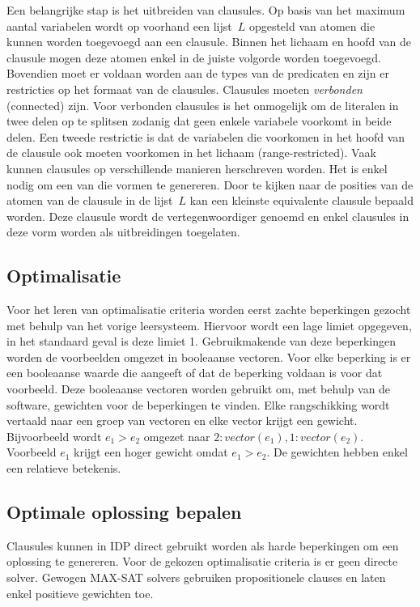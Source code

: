 Een belangrijke stap is het uitbreiden van clausules.
Op basis van het maximum aantal variabelen wordt op voorhand een lijst~$L$ opgesteld van atomen die kunnen worden toegevoegd aan een clausule.
Binnen het lichaam en hoofd van de clausule mogen deze atomen enkel in de juiste volgorde worden toegevoegd.
Bovendien moet er voldaan worden aan de types van de predicaten en zijn er restricties op het formaat van de clausules.
Clausules moeten \emph{verbonden} (connected) zijn.
Voor verbonden clausules is het onmogelijk om de literalen in twee delen op te splitsen zodanig dat geen enkele variabele voorkomt in beide delen.
Een tweede restrictie is dat de variabelen die voorkomen in het hoofd van de clausule ook moeten voorkomen in het lichaam (range-restricted).
Vaak kunnen clausules op verschillende manieren herschreven worden.
Het is enkel nodig om een van die vormen te genereren.
Door te kijken naar de posities van de atomen van de clausule in de lijst~$L$ kan een kleinste equivalente clausule bepaald worden.
Deze clausule wordt de vertegenwoordiger genoemd en enkel clausules in deze vorm worden als uitbreidingen toegelaten.

\subsection{Optimalisatie}
Voor het leren van optimalisatie criteria worden eerst zachte beperkingen gezocht met behulp van het vorige leersysteem.
Hiervoor wordt een lage limiet opgegeven, in het standaard geval is deze limiet 1.
Gebruikmakende van deze beperkingen worden de voorbeelden omgezet in booleaanse vectoren.
Voor elke beperking is er een booleaanse waarde die aangeeft of dat de beperking voldaan is voor dat voorbeeld.
Deze booleaanse vectoren worden gebruikt om, met behulp van de \svm software, gewichten voor de beperkingen te vinden.
Elke rangschikking wordt vertaald naar een groep van vectoren en elke vector krijgt een gewicht.
Bijvoorbeeld wordt $e_1 > e_2$ omgezet naar $2:\mathit{vector}(e_1), 1:\mathit{vector}(e_2)$.
Voorbeeld $e_1$ krijgt een hoger gewicht omdat $e_1 > e_2$.
De gewichten hebben enkel een relatieve betekenis.

\subsection{Optimale oplossing bepalen}
Clausules kunnen in IDP direct gebruikt worden als harde beperkingen om een oplossing te genereren.
Voor de gekozen optimalisatie criteria is er geen directe solver.
Gewogen MAX-SAT solvers gebruiken propositionele clauses en laten enkel positieve gewichten toe.


